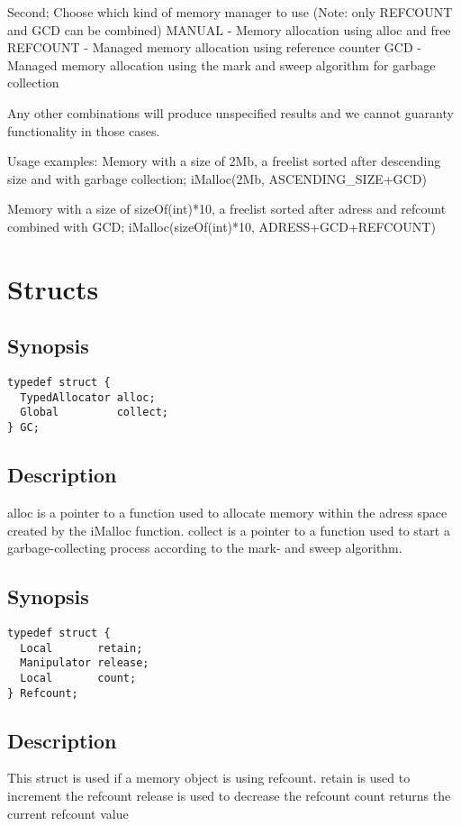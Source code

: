 \documentclass{article}
\begin{document}
Second; Choose which kind of memory manager to use (Note: only REFCOUNT and GCD can be combined)
MANUAL -  Memory allocation using alloc and free
REFCOUNT - Managed memory allocation using reference counter
GCD - Managed memory allocation using the mark and sweep algorithm for garbage collection

Any other combinations will produce unspecified results and we cannot guaranty functionality
in those cases.

Usage examples:
Memory with a size of 2Mb, a freelist sorted after descending size and with garbage collection;
iMalloc(2Mb, ASCENDING\_SIZE+GCD)

Memory with a size of sizeOf(int)*10, a freelist sorted after adress and refcount combined with GCD;
iMalloc(sizeOf(int)*10, ADRESS+GCD+REFCOUNT)


\section{Structs}
\subsection{Synopsis}
\begin{verbatim}
typedef struct {
  TypedAllocator alloc;
  Global         collect;
} GC;
\end{verbatim}
\subsection*{Description}
alloc is a pointer to a function used to allocate memory within the adress space created by the iMalloc function.
collect is a pointer to a function used to start a garbage-collecting process according to the mark- and sweep algorithm.

\subsection{Synopsis}
\begin{verbatim}
typedef struct {
  Local       retain;
  Manipulator release;
  Local       count;
} Refcount;
\end{verbatim}
\subsection*{Description}
This struct is used if a memory object is using refcount.
retain is used to increment the refcount
release is used to decrease the refcount
count returns the current refcount value
\end{document}
